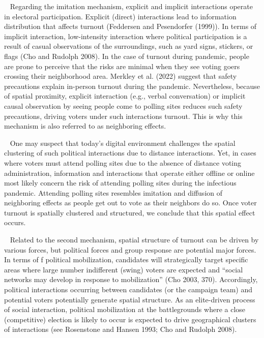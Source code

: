 \documentclass[
  12pt,
]{article}
\begin{document}
~ Regarding the imitation mechanism, explicit and implicit interactions
operate in electoral participation. Explicit (direct) interactions lead
to information distribution that affects turnout (Feddersen and
Pesendorfer (1999)). In terms of implicit interaction, low-intensity
interaction where political participation is a result of casual
observations of the surroundings, such as yard signs, stickers, or flags
(Cho and Rudolph 2008). In the case of turnout during pandemic, people
are prone to perceive that the risks are minimal when they see voting
goers crossing their neighborhood area. Merkley et al. (2022) suggest
that safety precautions explain in-person turnout during the pandemic.
Nevertheless, because of spatial proximity, explicit interaction (e.g.,
verbal conversation) or implicit causal observation by seeing people
come to polling sites reduces such safety precautions, driving voters
under such interactions turnout. This is why this mechanism is also
referred to as neighboring effects.

~ One may suspect that today's digital environment challenges the
spatial clustering of such political interactions due to distance
interactions. Yet, in cases where voters must attend polling sites due
to the absence of distance voting administration, information and
interactions that operate either offline or online most likely concern
the risk of attending polling sites during the infectious pandemic.
Attending polling sites resembles imitation and diffusion of neighboring
effects as people get out to vote as their neighbors do so. Once voter
turnout is spatially clustered and structured, we conclude that this
spatial effect occurs.

~ Related to the second mechanism, spatial structure of turnout can be
driven by various forces, but political forces and group response are
potential major forces. In terms of f political mobilization, candidates
will strategically target specific areas where large number indifferent
(swing) voters are expected and ``social networks may develop in
response to mobilization'' (Cho 2003, 370). Accordingly, political
interactions occurring between candidates (or the campaign team) and
potential voters potentially generate spatial structure. As an
elite-driven process of social interaction, political mobilization at
the battlegrounds where a close (competitive) election is likely to
occur is expected to drive geographical clusters of interactions (see
Rosenstone and Hansen 1993; Cho and Rudolph 2008).
\end{document}
